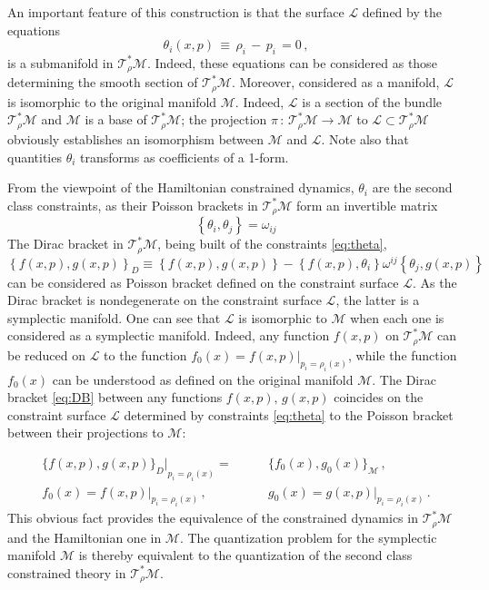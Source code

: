 \documentclass[a4paper,11pt,oneside]{amsart}
\theoremstyle{plain}
\numberwithin{equation}{section} %
\numberwithin{figure}{section} %
\newcommand{\pb}[2]{\left\{{}#1{},{}#2{}\right\}}
\def\mod{{\mathcal T}^*_\rho}
\def\manL{{\mathcal L}}
\def\manM{{\mathcal M}}
\begin{document}
\noindent
An important feature of this construction is that the
surface $\manL$ defined by the equations
\begin{equation}
\label{eq:theta}
\theta_i (x,p)\, \equiv \, \rho_i \, - \, p_i \,=0 \,,
\end{equation}
is a submanifold in $\mod\manM$. Indeed, these equations can be
considered as those determining the smooth section of
$\mod\manM$.  Moreover, considered as a manifold,
$\manL$ is isomorphic to the original manifold $\manM$.  Indeed, $\manL$
is a section of the bundle $\mod\manM$ and $\manM$ is a base of
$\mod\manM$; the projection $\pi\,:\,\mod\manM \to
\manM$ to $\manL \subset \mod\manM$ obviously establishes an isomorphism
between $\manM$ and $\manL$.  Note also that quantities $\theta_i$ transforms
as coefficients of a 1-form.


\noindent
{}From the viewpoint of the Hamiltonian constrained
dynamics, $\theta_i$ are the second class constraints, as their Poisson
brackets in $\mod\manM$ form an invertible matrix
\begin{equation}
\pb{\theta_i}{\theta_j}=\omega_{ij}
\label{thetatheta}
\end{equation}
The Dirac bracket in $\mod\manM$, being
built of the constraints \eqref{eq:theta},
\begin{equation}
\pb{f(x,p)}{g(x,p)}_D \equiv \pb{f(x,p)}{g(x,p)} -
\pb{f(x,p)}{\theta_i}\omega^{ij}\pb{\theta_j}{g(x,p)}
\label{eq:DB}
\end{equation}
can be considered as Poisson bracket defined
on the constraint surface $\manL$.  As the Dirac bracket
is nondegenerate on the constraint surface $\manL$, the
latter is a symplectic manifold.  One can see that
$\manL$ is isomorphic to $\manM$ when each one is
considered as a symplectic manifold.
Indeed, any function $f(x,p)$ on $\mod\manM$ can be reduced on $\manL$ to
the function $f_{0}(x)=f(x,p)|_{p_i=\rho_i(x)}$, while the function $f_{0}(x)$
can be understood as defined on the original manifold $\manM$.
The Dirac bracket \eqref{eq:DB} between any functions $f(x,p), \, g(x,p)$
coincides on the constraint surface $\manL$ determined by constraints
\eqref{eq:theta} to the Poisson bracket
between their projections to $\manM$:


\begin{equation}
\begin{split}
{{\{ f(x,p) , g(x,p) \}_D }{|}}_{\displaystyle p_i = \rho_i(x)}
=& \{ f_0(x) , g_0 (x) \}_{\manM} \, ,\\
f_0 (x) = f(x,p)|_{\displaystyle p_i = \rho_i(x)}\,, \qquad  \qquad &
g_0 (x) = g(x,p)|_{\displaystyle p_i = \rho_i(x)}\,.
\end{split}
\end{equation}
This obvious fact provides the equivalence of the constrained dynamics in
$\mod\manM$ and the Hamiltonian one in $\manM$.  The quantization
problem for the symplectic manifold $\manM$ is thereby equivalent to the
quantization of the second class constrained theory in $\mod\manM$.
\end{document}
